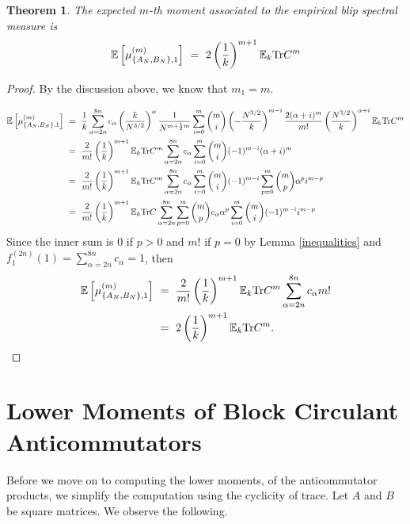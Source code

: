 \documentclass[12pt,reqno]{amsart}
\theoremstyle{plain} %
\newtheorem{theorem}{Theorem}[section]
\theoremstyle{remark}
\theoremstyle{definition}
\renewcommand{\a}{\alpha}
\begin{document}
\begin{theorem}
The expected $m$-th moment associated to the empirical blip spectral measure is
\begin{align*}
\mathbb{E}\left[\mu_{\{A_N,B_N\},1}^{(m)}\right] \ = \ 2\left(\frac{1}{k}\right)^{m+1}\mathbb{E}_k\textup{Tr}C^m
\end{align*}
\end{theorem}
\begin{proof}
By the discussion above, we know that $m_1=m$.

\begin{align*}
\mathbb{E}\left[\mu_{\{A_N,B_N\},1}^{(m)}\right] &\ = \ \frac{1}{k}\sum_{\a=2n}^{8n}c_\a\left(\frac{k}{N^{3/2}}\right)^\a\frac{1}{N^{m+\frac{1}{2}m}} \sum_{i=0}^m \binom{m}{i}\left(-\frac{N^{3/2}}{k}\right)^{m-i}\frac{2(\a+i)^m}{m!}\left(\frac{N^{3/2}}{k}\right)^{\a+i}\mathbb{E}_k\textup{Tr}C^{m} \\
&\ = \ \frac{2}{m!}\left(\frac{1}{k}\right)^{m+1}\mathbb{E}_k\textup{Tr}C^m \sum_{\a=2n}^{8n}c_\a\sum_{i=0}^m \binom{m}{i}(-1)^{m-i}(\a+i)^m \\
&\ = \ \frac{2}{m!}\left(\frac{1}{k}\right)^{m+1}\mathbb{E}_k\textup{Tr}C^m \sum_{\a=2n}^{8n}c_\a\sum_{i=0}^m \binom{m}{i}(-1)^{m-i}\sum_{p=0}^m \binom{m}{p}\a^{p}i^{m-p} \\
&\ = \ \frac{2}{m!}\left(\frac{1}{k}\right)^{m+1}\mathbb{E}_k\textup{Tr}C\sum_{\a=2n}^{8n}\sum_{p=0}^m\binom{m}{p}c_\a\a^p\sum_{i=0}^m\binom{m}{i}(-1)^{m-i}i^{m-p}
\end{align*}
Since the inner sum is 0 if $p>0$ and $m!$ if $p=0$ by Lemma \ref{inequalities} and $f_1^{(2n)}(1)=\sum_{\a=2n}^{8n}c_\a=1$, then
\begin{align*}
\mathbb{E}\left[\mu_{\{A_N,B_N\},1}^{(m)}\right] &\ = \ \frac{2}{m!}\left(\frac{1}{k}\right)^{m+1}\mathbb{E}_k\textup{Tr}C^m\sum_{\a=2n}^{8n}c_\a m! \\
&\ = \ 2\left(\frac{1}{k}\right)^{m+1}\mathbb{E}_k\textup{Tr}C^m.
\end{align*}
\end{proof}

\section{Lower Moments of Block Circulant Anticommutators}

Before we move on to computing the lower moments, of the 
anticommutator products, we simplify the computation using the 
cyclicity of trace. 
Let \(A\) and \(B\) be square matrices. We observe the following. 
\end{document}
